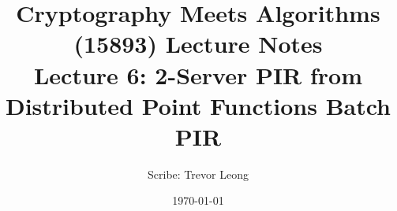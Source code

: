 \documentclass[11pt]{article}
\title{{\Large Cryptography Meets Algorithms (15893) Lecture Notes}\\[5pt]
{\bf Lecture 6: 2-Server PIR from Distributed Point Functions Batch PIR}}
\author{Scribe: Trevor Leong}
\date{\today}
\begin{document}
\maketitle


{

}


\end{document}
